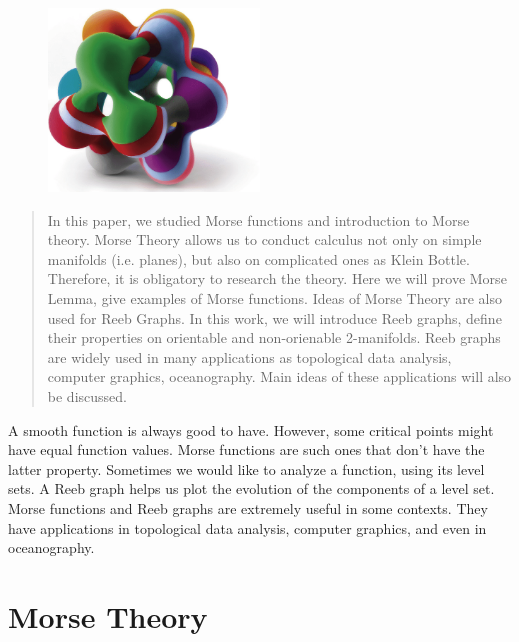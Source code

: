 \documentclass[]{article}
\begin{document}
 
\maketitle

\begin{figure}[h]
    \centering
    \includegraphics[width=0.50\textwidth]{cover}
\end{figure}
 
\tableofcontents
\newpage

\begin{abstract}
    In this paper, we studied Morse functions and introduction to Morse theory. Morse Theory allows us to conduct calculus not only on simple manifolds (i.e. planes), but also on complicated ones as Klein Bottle. Therefore, it is obligatory to research the theory. Here we will prove Morse Lemma, give examples of Morse functions. Ideas of Morse Theory are also used for Reeb Graphs. In this work, we will introduce Reeb graphs, define their properties on orientable and non-orienable 2-manifolds. Reeb graphs are widely used in many applications as topological data analysis, computer graphics, oceanography. Main ideas of these applications will also be discussed. 
\end{abstract}

A smooth function is always good to have. However, some critical points might have equal function values. Morse functions are such ones that don't have the latter property. 
Sometimes we would like to analyze a function, using its level sets. A Reeb graph helps us plot the evolution of the components of a level set. Morse functions and Reeb graphs are extremely useful
in some contexts. They have applications in topological data analysis, computer graphics, and even in oceanography.
\section{Morse Theory}
\end{document}
